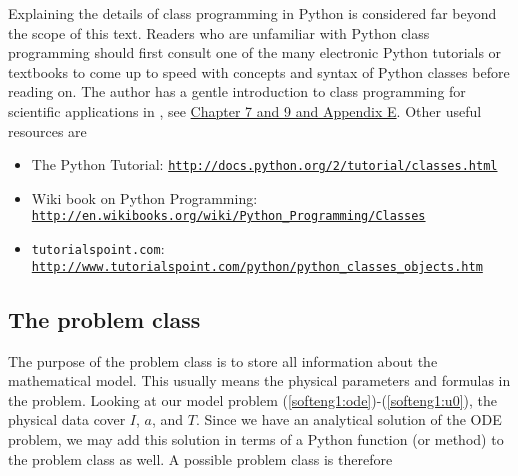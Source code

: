 \documentclass[graybox,sectrefs,envcountresetchap,open=right,final]{svmonodo}
\begin{document}
Explaining the details of class programming in Python is considered
far beyond the scope of this text.  Readers who are unfamiliar with Python
class programming should first consult one of the many electronic
Python tutorials or textbooks to come up to speed with concepts and
syntax of Python classes before reading on. The author has a gentle
introduction to class programming for scientific applications
in \cite{Langtangen_2012}, see \href{{http://hplgit.github.io/primer.html/doc/web/index.html}}{Chapter 7 and 9 and Appendix E}.
Other useful resources are

\begin{itemize}
 \item The Python Tutorial: \href{{http://docs.python.org/2/tutorial/classes.html}}{\nolinkurl{http://docs.python.org/2/tutorial/classes.html}}

 \item Wiki book on Python Programming: \href{{http://en.wikibooks.org/wiki/Python_Programming/Classes}}{\nolinkurl{http://en.wikibooks.org/wiki/Python_Programming/Classes}}

 \item \texttt{tutorialspoint.com}: \href{{http://www.tutorialspoint.com/python/python_classes_objects.htm}}{\nolinkurl{http://www.tutorialspoint.com/python/python_classes_objects.htm}}
\end{itemize}

\noindent
\subsection{The problem class}


The purpose of the problem class is to store all information about
the mathematical model. This usually means the physical parameters
and formulas
in the problem. Looking at our model problem
(\ref{softeng1:ode})-(\ref{softeng1:u0}), the physical data cover
$I$, $a$, and $T$. Since we have an analytical solution of
the ODE problem, we may add this solution in terms of a Python
function (or method) to the problem class as well.
A possible problem class is therefore
\end{document}
